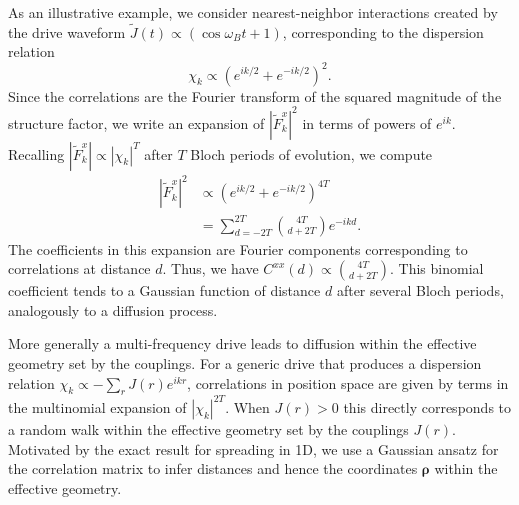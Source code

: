 \documentclass[aps,pra,twocolumn,superscriptaddress]{revtex4-1} %
\begin{document}
\begin{bibunit}
As an illustrative example, we consider nearest-neighbor interactions created by the drive waveform $\tilde{J}(t) \propto (\cos \omega_B t + 1)$, corresponding to the dispersion relation
\begin{equation}
    \chi_k \propto \left(e^{ik/2} + e^{-ik/2}\right)^2.
\end{equation}
Since the correlations are the Fourier transform of the squared magnitude of the structure factor, we write an expansion of $|\tilde{F}^x_k|^2$ in terms of powers of $e^{ik}$. Recalling $|\tilde{F}^x_k|\propto |\chi_k|^T$ after $T$ Bloch periods of evolution, we compute
\begin{equation}
\begin{aligned}
    |\tilde{F}^x_k|^2 &\propto \left(e^{ik/2} + e^{-ik/2}\right)^{4T} \\
    &=\sum_{d = -2T}^{2T} {{4T} \choose {d+2T}} e^{-ikd}.
\end{aligned}
\end{equation}
The coefficients in this expansion are Fourier components corresponding to correlations at distance $d$. Thus, we have $C^{xx}(d) \propto {{4T} \choose {d+2T}}$. This binomial coefficient tends to a Gaussian function of distance $d$ after several Bloch periods, analogously to a diffusion process.

More generally a multi-frequency drive leads to diffusion within the effective geometry set by the couplings. For a generic drive that produces a dispersion relation $\chi_k \propto -\sum_r J(r)e^{ikr}$, correlations in position space are given by terms in the multinomial expansion of $|\chi_k|^{2T}$. When $J(r)>0$ this directly corresponds to a random walk within the effective geometry set by the couplings $J(r)$. Motivated by the exact result for spreading in 1D, we use a Gaussian ansatz for the correlation matrix to infer distances and hence the coordinates $\boldsymbol{\rho}$ within the effective geometry.



\end{bibunit}
\end{document}

